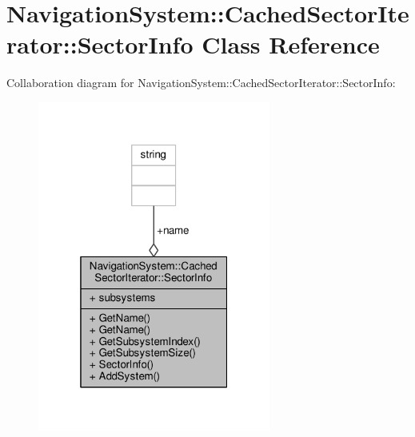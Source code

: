 \hypertarget{classNavigationSystem_1_1CachedSectorIterator_1_1SectorInfo}{}\section{Navigation\+System\+:\+:Cached\+Sector\+Iterator\+:\+:Sector\+Info Class Reference}
\label{classNavigationSystem_1_1CachedSectorIterator_1_1SectorInfo}


Collaboration diagram for Navigation\+System\+:\+:Cached\+Sector\+Iterator\+:\+:Sector\+Info\+:
\nopagebreak
\begin{figure}[H]
\begin{center}
\leavevmode
\includegraphics[width=217pt]{db/d39/classNavigationSystem_1_1CachedSectorIterator_1_1SectorInfo__coll__graph}
\end{center}
\end{figure}
